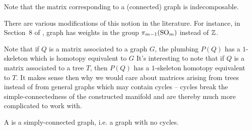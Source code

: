 \begin{remark}
	Note that the matrix corresponding to a (connected) graph is indecomposable.
\end{remark}

\begin{remark}
	There are various modifications of this notion in the literature. For instance, in Section~8 of \cite{hirzebruch1971quadratic}, graph has weights in the group $\pi_{m-1}(\mathrm{SO}_m)$ instead of $\mathbb{Z}$.
\end{remark}

Note that if $Q$ is a matrix associated to a graph $G$, the plumbing $P(Q)$ has a $1$-skeleton which is homotopy equivalent to $G$
It's interesting to note that if $Q$ is a matrix associated to a tree $T$, then $P(Q)$ has a $1$-skeleton homotopy equivalent to $T$.
It makes sense then why we would care about matrices arising from trees instead of from general graphs which may contain cycles -- cycles break the simple-connectedness of the constructed manifold and are thereby much more complicated to work with.

\begin{definition}
	A  is a simply-connected graph, i.e. a graph with no cycles.
\end{definition}

